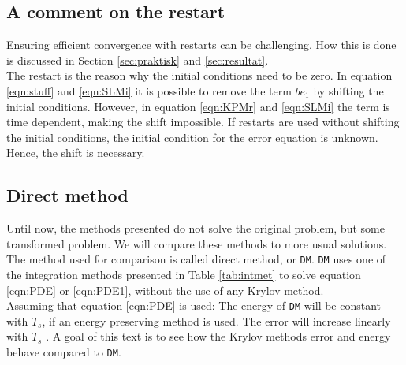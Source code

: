 \subsection{A comment on the restart} \label{sec:comment} %

\noindent Ensuring efficient convergence with restarts can be challenging. How this is done is discussed in Section \ref{sec:praktisk} and \ref{sec:resultat}. \\

\noindent The restart is the reason why the initial conditions need to be zero. In equation \eqref{eqn:stuff} and \eqref{eqn:SLMi} it is possible to remove the term $be_1$ by shifting the initial conditions. However, in equation \eqref{eqn:KPMr} and \eqref{eqn:SLMi} the term is time dependent, making the shift impossible. If restarts are used without shifting the initial conditions, the initial condition for the error equation is unknown. Hence, the shift is necessary.

\subsection{Direct method} \label{sec:DM}
Until now, the methods presented do not solve the original problem, but some transformed problem. We will compare these methods to more usual solutions. The method used for comparison is called direct method, or \texttt{DM}. \texttt{DM} uses one of the integration methods presented in Table \ref{tab:intmet} to solve equation \eqref{eqn:PDE} or \eqref{eqn:PDE1}, without the use of any Krylov method.\\


\noindent Assuming that equation \eqref{eqn:PDE} is used: The energy of \texttt{DM} will be constant with $T_s$, if an energy preserving method is used. The error will increase linearly with $T_s$ \cite{linearerrorgrowth}. A goal of this text is to see how the Krylov methods error and energy behave compared to \texttt{DM}. \\


